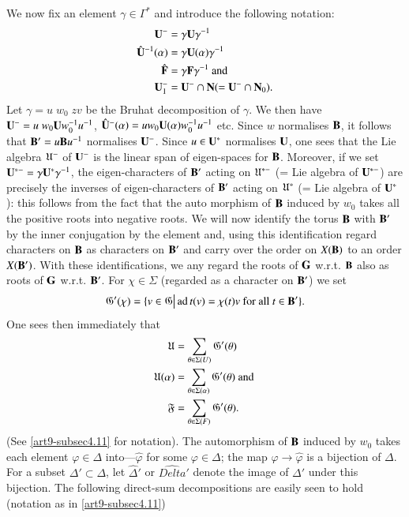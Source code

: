\subsection{}\label{art9-subsec4.16} 
We now fix an element $\gamma \in \Gamma^\ast$ and introduce the following notation:
\begin{align*}
\mathbf{U}^- & = \gamma \mathbf{U} \gamma^{-1}\\
\hat{\mathbf{U}}^{-1} (\alpha) & = \gamma \mathbf{U} (\alpha) \gamma^{-1}\\
\hat{\mathbf{F}} & = \gamma \mathbf{F} \gamma^{-1} \text{ and }\\
\mathbf{U}^-_1 & = \mathbf{U}^- \cap \mathbf{N} (= \mathbf{U}^- \cap \mathbf{N}_0).
\end{align*}\pageoriginale
Let $\gamma = u\; w_0 \; zv$ be the Bruhat decomposition of $\gamma$. We then have $\mathbf{U}^- = u\; w_0 \mathbf{U} w^{-1}_0 u^{-1}$, $\hat{\mathbf{U}}^-(\alpha) = u w_0\mathbf{U} (\alpha) w^{-1}_0 u^{-1}$ etc. Since $w$ normalises $\mathbf{B}$, it follows that $\mathbf{B}' = u \mathbf{B} u^{-1}$ normalises $\mathbf{U}^-$. Since $u \in \mathbf{U}^\ast$ normalises $\mathbf{U}$, one sees that the Lie algebra $\mathfrak{U}^-$ of $\mathbf{U}^-$ is the linear span of eigen-spaces for $\mathbf{B}$. Moreover, if we set $\mathbf{U}^{\ast-} = \gamma \mathbf{U}^\ast \gamma^{-1}$, the eigen-characters of $\mathbf{B}'$ acting on $\mathfrak{U}^{\ast-}$ (= Lie algebra of $\mathbf{U}^{\ast-}$) are precisely the inverses of eigen-characters of $\mathbf{B}'$ acting on $\mathfrak{U}^\ast$ (= Lie algebra of $\mathbf{U}^\ast$): this follows from the fact that the auto morphism of $\mathbf{B}$ induced by $w_0$ takes all the positive roots into negative roots. We will now identify the torus $\mathbf{B}$ with $\mathbf{B}'$ by the inner conjugation by the element and, using this identification regard characters on $\mathbf{B}$ as characters on $\mathbf{B}'$ and carry over the order on $X (\mathbf{B})$ to an order $X (\mathbf{B}')$. With these identifications, we any regard the roots of $\mathbf{G}$ w.r.t. $\mathbf{B}$ also as roots of $\mathbf{G}$ w.r.t. $\mathbf{B}'$. For $\chi \in \Sigma$ (regarded as a character on $\mathbf{B}'$) we set
$$
\mathfrak{G}'(\chi) = \{v \in \mathfrak{G} \big| \operatorname{ad} t (v) = \chi (t) v \text{ for all } t \in \mathbf{B}'\}.
$$
One sees then immediately that 
\begin{align*}
\mathfrak{U} & = \sum\limits_{\theta \in \Sigma (U)} \mathfrak{G}'(\theta)\\
\mathfrak{U} (\alpha) & = \sum\limits_{\theta \in\Sigma (\alpha)} \mathfrak{G}'(\theta) \text{ and }\\
\mathfrak{F} & = \sum\limits_{\theta \in \Sigma (F)} \mathfrak{G}'(\theta).
\end{align*}
(See \ref{art9-subsec4.11} for notation). The automorphism of $\mathbf{B}$ induced by $w_0$ takes each element $\varphi \in \Delta$ into---$\hat{\varphi}$ for some $\varphi \in \Delta$; the map $\varphi \to \hat{\varphi}$ is a bijection of $\Delta$. For a subset $\Delta' \subset \Delta$, let $\hat{\Delta}'$ or $\hat{Delta}'$ denote the image of $\Delta'$ under this bijection. The following direct-sum decompositions are easily seen to hold (notation as in \ref{art9-subsec4.11})
